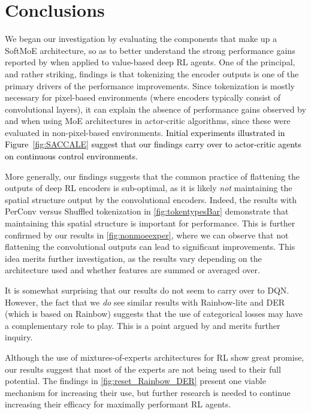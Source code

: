 \documentclass{article} %
\newcommand{\rebuttal}[1]{\textcolor{black}{#1}}
\begin{document}
\section{Conclusions}
\label{sec:conclusions}
We began our investigation by evaluating the components that make up a SoftMoE architecture, so as to better understand the strong performance gains reported by \citet{ceron2024mixtures} when applied to value-based deep RL agents. One of the principal, and rather striking, findings is that tokenizing the encoder outputs is one of the primary drivers of the performance improvements. Since tokenization is mostly necessary for pixel-based environments (where encoders typically consist of convolutional layers), it can explain the absence of performance gains observed by \citet{ceron2024mixtures} and \citet{willi2024mixture} when using MoE architectures in actor-critic algorithms, since these were evaluated in non-pixel-based environments. \rebuttal{Initial experiments illustrated in Figure~\ref{fig:SACCALE} suggest that our findings carry over to actor-critic agents on continuous control environments.}

More generally, our findings suggests that the common practice of flattening the outputs of deep RL encoders is sub-optimal, as it is likely {\em not} maintaining the spatial structure output by the convolutional encoders. Indeed, the results with PerConv versus Shuffled tokenization in \autoref{fig:tokentypesBar} demonstrate that maintaining this spatial structure is important for performance. This is further confirmed by our results in \autoref{fig:nonmoeexper}, where we can observe that not flattening the convolutional outputs can lead to significant improvements. This idea merits further investigation, as the results vary depending on the architecture used and whether features are summed or averaged over.

It is somewhat surprising that our results do not seem to carry over to DQN. However, the fact that we {\em do} see similar results with Rainbow-lite and DER (which is based on Rainbow) suggests that the use of categorical losses may have a complementary role to play. This is a point argued by \citet{farebrother24classification} and merits further inquiry.

 Although the use of mixtures-of-experts architectures for RL show great promise, our results suggest that most of the experts are not being used to their full potential. The findings in \autoref{fig:reset_Rainbow_DER} present one viable mechanism for increasing their use, but further research is needed to continue increasing their efficacy for maximally performant RL agents.
\end{document}
